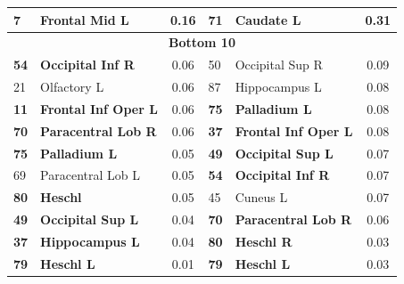 \documentclass[doubleblind]{ecai}
\begin{document}
\begin{table}[h]
\begin{tabular}{@{}llcllc@{}}
      \textbf{7} & \textbf{Frontal Mid L} & 0.16 & 71 & Caudate L & 0.31\\
      \midrule
      \multicolumn{6}{c}{\textbf{Bottom 10}}\\
      \midrule
      \textbf{54} & \textbf{Occipital Inf R} & 0.06& 50 & Occipital Sup R & 0.09\\
      21 & Olfactory L & 0.06 & 87 & Hippocampus L & 0.08\\
      \textbf{11} & \textbf{Frontal Inf Oper L} & 0.06 & \textbf{75} & \textbf{Palladium L} & 0.08\\
      \textbf{70} & \textbf{Paracentral Lob R} & 0.06 & \textbf{37} & \textbf{Frontal Inf Oper L} & 0.08\\
      \textbf{75} & \textbf{Palladium L} & 0.05 & \textbf{49} & \textbf{Occipital Sup L} & 0.07\\
      69 & Paracentral Lob L & 0.05 & \textbf{54} & \textbf{Occipital Inf R} & 0.07\\
      \textbf{80} & \textbf{Heschl } & 0.05 & 45 & Cuneus L & 0.07\\
      \textbf{49} & \textbf{Occipital Sup L} & 0.04 & \textbf{70} & \textbf{Paracentral Lob R} &0.06\\
      \textbf{37} & \textbf{Hippocampus L} & 0.04 & \textbf{80} & \textbf{Heschl R} & 0.03\\
      \textbf{79} & \textbf{Heschl L} & 0.01 & \textbf{79} & \textbf{Heschl L} & 0.03\\
    \bottomrule
  \end{tabular}
  \label{tab:regions_best_worst_overallheader}
\end{table}
\end{document}
